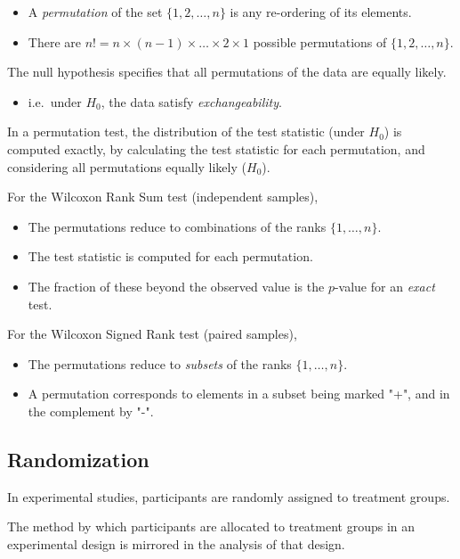 \begin{itemize}
\item
A \emph{permutation} of the set $\{1,2,\ldots,n\}$ is any re-ordering of its elements.
\item
There are $n! = n\times(n-1)\times\ldots\times 2\times 1$ possible permutations of $\{1,2,\ldots,n\}$.
\end{itemize}

The null hypothesis specifies that all permutations of the data are equally likely.
\begin{itemize}
\item i.e.\ under $H_0$, the data satisfy \emph{exchangeability}.
\end{itemize}

In a permutation test, the distribution of the test statistic (under $H_0$) is computed exactly, by calculating the test statistic for each permutation, and considering all permutations equally likely ($H_0$).

For the Wilcoxon Rank Sum test (independent samples),
\begin{itemize}
\item The permutations reduce to combinations of the ranks $\{1,\ldots,n\}$.
\item The test statistic is computed for each permutation.
\item The fraction of these beyond the observed value is the $p$-value for an \emph{exact} test.
\end{itemize}
	
For the Wilcoxon Signed Rank test (paired samples),
\begin{itemize}
\item The permutations reduce to \emph{subsets} of the ranks $\{1,\ldots,n\}$.
\item A permutation corresponds to elements in a subset being marked "+", and in the complement by "-".
\end{itemize}
	
\subsection{Randomization}
In experimental studies, participants are randomly assigned to treatment groups.

The method by which participants are allocated to treatment groups in an experimental design is mirrored in the analysis of that design. 

